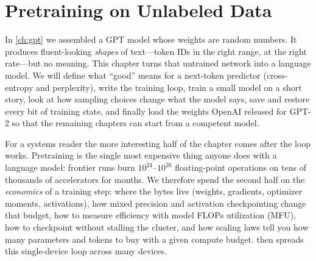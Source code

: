 \chapter{Pretraining on Unlabeled Data}\label{ch:pretrain}

In \cref{ch:gpt} we assembled a GPT model whose weights are random numbers. It produces
fluent-looking \emph{shapes} of text---token IDs in the right range, at the right rate---but
no meaning. This chapter turns that untrained network into a language model. We will define
what ``good'' means for a next-token predictor (cross-entropy and perplexity), write the
training loop, train a small model on a short story, look at how sampling choices change what
the model says, save and restore every bit of training state, and finally load the weights
OpenAI released for GPT-2 so that the remaining chapters can start from a competent model.

For a systems reader the more interesting half of the chapter comes after the loop works.
Pretraining is the single most expensive thing anyone does with a language model: frontier
runs burn $10^{24}$--$10^{26}$ floating-point operations on tens of thousands of accelerators
for months. We therefore spend the second half on the \emph{economics} of a training step:
where the bytes live (weights, gradients, optimizer moments, activations), how mixed precision
and activation checkpointing change that budget, how to measure efficiency with model FLOPs
utilization (MFU), how to checkpoint without stalling the cluster, and how scaling laws tell
you how many parameters and tokens to buy with a given compute budget. 
then spreads this single-device loop across many devices.

